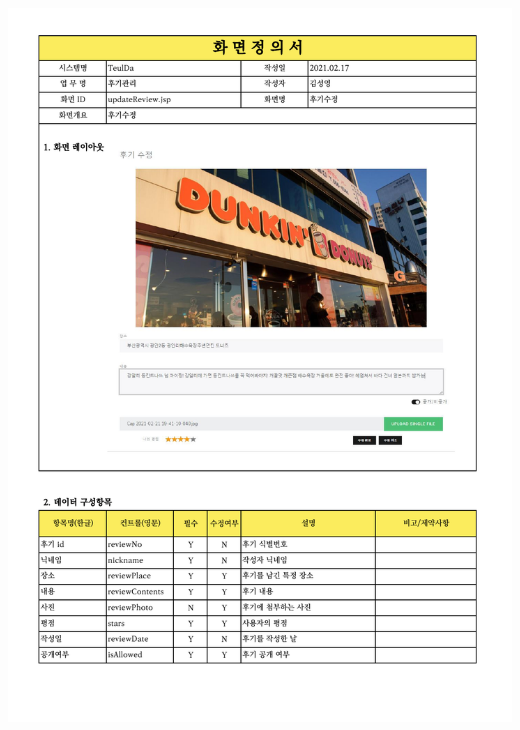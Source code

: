 {{{{{{{{{{{{{{{{{{{{{{{{{{{{{{{{{{{{{{{{{{{{{{{{{{{{{{{{{{{{{{{{{{{{{{{{{{\includegraphics[width=20cm]{./Figure/Design/Display/review/review_05.pdf} \\
}}}}}}}}}}}}}}}}}}}}}}}}}}}}}}}}}}}}}}}}}}}}}}}}}}}}}}}}}}}}}}}}}}}}}}}}}}
